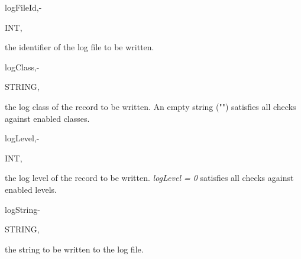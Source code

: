\hfill
\begin{minipage}{\dimexpr\textwidth-2em}

        \medskip
        \begin{minipage}[t][][b]{9.5em}logFileId,\hfill{-}\end{minipage}
        \begin{minipage}[t][][b]{5.5em}INT,\hfill\end{minipage}
        \begin{minipage}[t][][b]{\dimexpr\textwidth-15.5em}
            the identifier of the log file to be written.
        \end{minipage}\vfill

        \medskip
        \begin{minipage}[t][][b]{9.5em}logClass,\hfill{-}\end{minipage}
        \begin{minipage}[t][][b]{5.5em}STRING,\hfill\end{minipage}
        \begin{minipage}[t][][b]{\dimexpr\textwidth-15.5em}
            the log class of the record to be written. An empty string ("") satisfies all checks against enabled classes.
        \end{minipage}\vfill

        \medskip
        \begin{minipage}[t][][b]{9.5em}logLevel,\hfill{-}\end{minipage}
        \begin{minipage}[t][][b]{5.5em}INT,\hfill\end{minipage}
        \begin{minipage}[t][][b]{\dimexpr\textwidth-15.5em}
            the log level of the record to be written. \textit{logLevel = 0} satisfies all checks against enabled levels.
        \end{minipage}\vfill

        \medskip
        \begin{minipage}[t][][b]{9.5em}logString\hfill{-}\end{minipage}
        \begin{minipage}[t][][b]{5.5em}STRING,\hfill\end{minipage}
        \begin{minipage}[t][][b]{\dimexpr\textwidth-15.5em}
            the string to be written to the log file.
        \end{minipage}\vfill
\end{minipage}

